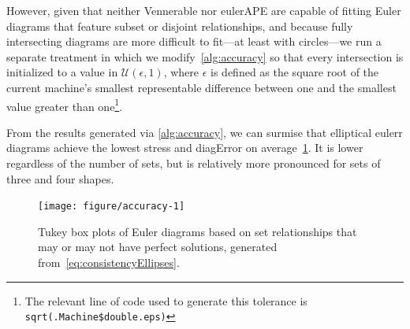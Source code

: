 \documentclass[
  oneside,
  openany,
  numbers=noendperiod,
  parskip=half,
  bibliography=totoc
]{scrbook}\usepackage[]{graphicx}\usepackage{xcolor}
\newenvironment{knitrout}{}{} %
\newcommand{\pkg}[1]{{\fontseries{b}\selectfont #1}}
\newcommand{\code}[1]{\texttt{#1}}
\begin{document}
\begin{alg}
\DontPrintSemicolon
\caption{The algorithm we use to simulate random set relationships and fit
them with the software under study to assess their accuracy.\label{alg:accuracy}}
\end{alg}

However, given that neither \pkg{Vennerable} nor \pkg{eulerAPE} are capable
of fitting Euler diagrams that feature subset or disjoint relationships, and
because fully intersecting diagrams are more difficult to fit---at least
with circles---we run a separate treatment
in which we modify~\autoref{alg:accuracy} so that every intersection
is initialized to a value in $\mathcal{U}(\epsilon, 1)$, where
$\epsilon$ is defined as the square root of the current machine's smallest
representable difference between one and the smallest value greater than
one\footnote{The relevant line of code used to generate this tolerance is
\code{sqrt(.Machine\$double.eps)}}.



From the results generated via \autoref{alg:accuracy}, we can
surmise that elliptical \pkg{eulerr} diagrams achieve the lowest stress and
diagError on average~\cref{fig:accuracy}. It is lower regardless of the
number of sets, but is relatively more pronounced for sets of three and four shapes.

\begin{figure}[hbtp]
\begin{knitrout}\small
{}\color{fgcolor}

{\centering \texttt{[image: figure/accuracy-1]}

}



\end{knitrout}
\caption{Tukey box plots of Euler diagrams based on set relationships that may
or may not have perfect solutions, generated from~\eqref{eq:consistencyEllipses}.}
\label{fig:accuracy}
\end{figure}
\end{document}
